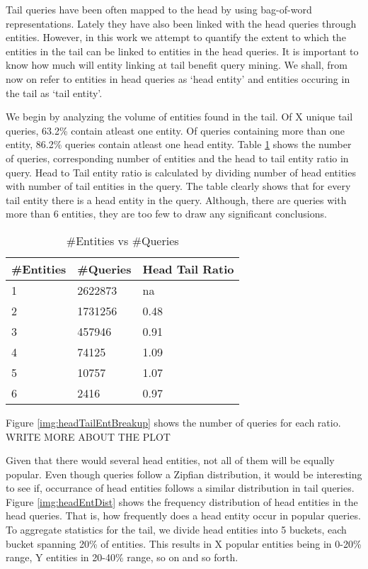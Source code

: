 Tail queries have been often mapped to the head \cite{} by using bag-of-word representations.
Lately they have also been linked with the head queries through entities. However, in this work
we attempt to quantify the extent to which the entities in the tail can be linked to entities 
in the head queries. It is important to know how much will entity linking at tail benefit query mining. 
We shall, from now on refer to entities in head queries as `head entity' 
and entities occuring in the tail as `tail entity'. 

We begin by analyzing the volume of entities found in the tail. Of X unique tail queries,
63.2\% contain atleast one entity. Of queries containing more than one entity,  
86.2\% queries contain atleast one head entity. Table \ref{table:entDist} shows the number of 
queries, corresponding number of entities and the head to tail entity ratio in query. 
Head to Tail entity ratio is calculated by dividing number of head entities with number of 
tail entities in the query. The table clearly shows that for every tail entity there is a 
head entity in the query. Although, there are queries with more than 6 entities, 
they are too few to draw any significant conclusions. 
\begin{table}
\caption{\#Entities vs \#Queries}
\label{table:entDist}
\centering
\begin{tabular}{|l|l|l|}
\hline
\#Entities & \#Queries & Head Tail Ratio \\ \hline
1 & 2622873 & na \\ \hline
2 & 1731256 & 0.48 \\ \hline
3 & 457946  & 0.91 \\ \hline
4 & 74125 & 1.09  \\ \hline
5 & 10757 & 1.07 \\ \hline
6 & 2416  & 0.97 \\ \hline
\end{tabular}
\end{table}

Figure \ref{img:headTailEntBreakup} shows the number of queries for each ratio. 
WRITE MORE ABOUT THE PLOT

Given that there would several head entities, not all of them will be equally popular. 
Even though queries follow a Zipfian distribution, it would be interesting to see if, 
occurrance of head entities follows a similar distribution in tail queries. 
Figure \ref{img:headEntDist} shows the frequency distribution of head entities in the 
head queries. That is, how frequently does a head entity occur in popular queries. 
To aggregate statistics for the tail, we divide head entities into 5 buckets, each bucket
spanning 20\% of entities. This results in X popular entities being in 0-20\% range, Y 
entities in 20-40\% range, so on and so forth. 

